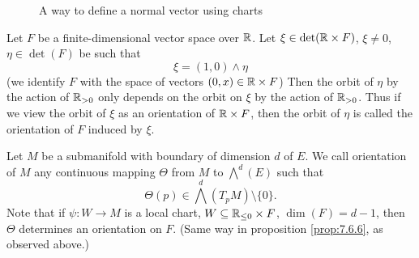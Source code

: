\begin{figure}[H]
\caption*{A way to define a normal vector using charts}
\end{figure}

\begin{definitionenv}
    Let $F$ be a finite-dimensional vector space over $\mathbb{R}$.
    Let $\xi \in \det(\mathbb{R} \times F)$, $\xi \neq 0$, $\eta \in \det (F)$ be such that
    $$\xi = (1,0) \wedge \eta$$
    (we identify $F$ with the space of vectors $(0,x) \in \mathbb{R} \times F$)
    Then the orbit of $\eta$ by the action of $\mathbb{R}_{> 0}$ only depends on the orbit on $\xi$ by the action of $\mathbb{R}_{>0}$.
    Thus if we view the orbit of $\xi$ as an orientation of $\mathbb{R} \times F$, then the orbit of $\eta$ is called the orientation of $F$ induced by $\xi$.

    \quad Let $M$ be a submanifold with boundary of dimension $d$ of $E$.
    We call orientation of $M$ any continuous mapping $\Theta$ from $M$ to $\bigwedge^d(E)$ such that
    $$\Theta (p) \in \bigwedge^d (T_p M) \setminus \{0\}.$$
    Note that if $\psi : W \longrightarrow M$ is a local chart, $W \subseteq \mathbb{R}_{\le 0} \times F$,
    $\dim(F) = d - 1$, then $\Theta$ determines an orientation on $F$.
    (Same way in proposition \ref{prop:7.6.6}, as observed above.)


\end{definitionenv}

